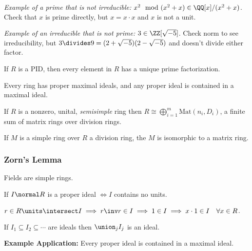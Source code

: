 \emph{Example of a prime that is not irreducible:}
\(x^2 \mod (x^2 + x) \in \QQ[x]/(x^2 + x)\). Check that \(x\) is prime
directly, but \(x=x\cdot x\) and \(x\) is not a unit.

\emph{Example of an irreducible that is not prime:}
\(3\in \ZZ[\sqrt{-5}]\). Check norm to see irreducibility, but
\(3 \divides 9 = (2+\sqrt{-5})(2-\sqrt{-5})\) and doesn't divide either
factor.

\begin{description}
\tightlist
\item[Lemma]
If \(R\) is a PID, then every element in \(R\) has a unique prime
factorization.
\item[Theorem (Krull)]
Every ring has proper maximal ideals, and any proper ideal is contained
in a maximal ideal.
\item[Theorem (Artin-Wedderubrn)]
If \(R\) is a nonzero, unital, \emph{semisimple} ring then
\(R \cong \bigoplus_{i=1}^m \mathrm{Mat}(n_i, D_i)\), a finite sum of
matrix rings over division rings.
\item[Corollary]
If \(M\) is a simple ring over \(R\) a division ring, the \(M\) is
isomorphic to a matrix ring.
\end{description}

\hypertarget{zorns-lemma}{%
\subsubsection{Zorn's Lemma}\label{zorns-lemma}}

\begin{description}
\tightlist
\item[Lemma]
Fields are simple rings.
\item[Lemma]
If \(I\normal R\) is a proper ideal \(\iff I\) contains no units.
\item[Proof]
\(r\in R\units \intersect I \implies r\inv r \in I \implies 1\in I \implies x\cdot 1 \in I \quad \forall x\in R\).
\item[Lemma]
If \(I_1 \subseteq I_2 \subseteq \cdots\) are ideals then
\(\union_j I_j\) is an ideal.
\end{description}

\textbf{Example Application:} Every proper ideal is contained in a
maximal ideal.

